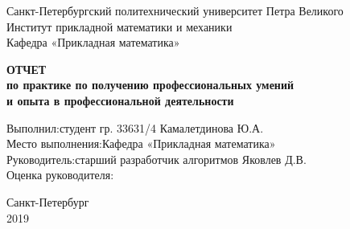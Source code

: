\begin{titlepage}

\begin{center}
Санкт-Петербургский политехнический университет Петра Великого\\
Институт прикладной математики и механики\\
Кафедра «Прикладная математика»\\
\end{center}

\vspace{3cm}

\begin{center}
{\large {\bfseries ОТЧЕТ\\
по практике по получению профессиональных умений \\ и опыта в
профессиональной деятельности}}\\
\end{center}

\vspace{2.5cm}

\begin{flushleft}
Выполнил:\hfill студент гр. 33631/4 \;Камалетдинова Ю.А. \\ 

Место выполнения:\hfill Кафедра «Прикладная математика»  \\
Руководитель:\hfill старший разработчик алгоритмов Яковлев Д.В. \\
Оценка руководителя:

\end{flushleft}

\vspace{3cm}

\begin{center}
Санкт-Петербург\\
2019
\end{center}

\end{titlepage}
